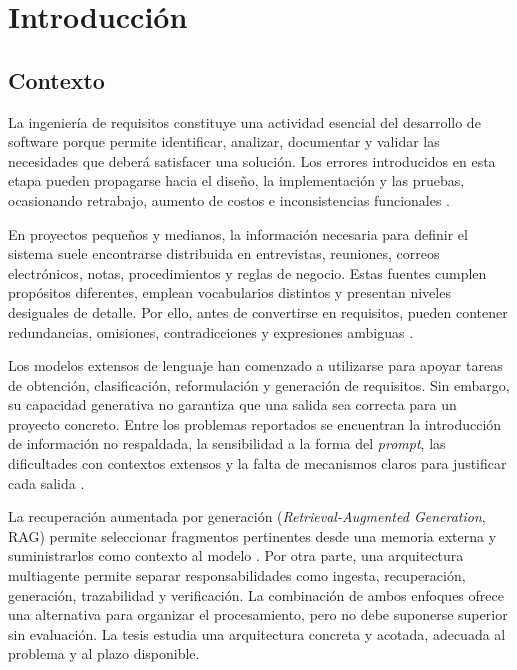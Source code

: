 \chapter{Introducción}
\label{cap:introduccion}

\section{Contexto}

La ingeniería de requisitos constituye una actividad esencial del desarrollo de software porque permite identificar, analizar, documentar y validar las necesidades que deberá satisfacer una solución. Los errores introducidos en esta etapa pueden propagarse hacia el diseño, la implementación y las pruebas, ocasionando retrabajo, aumento de costos e inconsistencias funcionales \cite{sommerville2011}.

En proyectos pequeños y medianos, la información necesaria para definir el sistema suele encontrarse distribuida en entrevistas, reuniones, correos electrónicos, notas, procedimientos y reglas de negocio. Estas fuentes cumplen propósitos diferentes, emplean vocabularios distintos y presentan niveles desiguales de detalle. Por ello, antes de convertirse en requisitos, pueden contener redundancias, omisiones, contradicciones y expresiones ambiguas \cite{wagner2019,palomares2021}.

Los modelos extensos de lenguaje han comenzado a utilizarse para apoyar tareas de obtención, clasificación, reformulación y generación de requisitos. Sin embargo, su capacidad generativa no garantiza que una salida sea correcta para un proyecto concreto. Entre los problemas reportados se encuentran la introducción de información no respaldada, la sensibilidad a la forma del \emph{prompt}, las dificultades con contextos extensos y la falta de mecanismos claros para justificar cada salida \cite{norheim2024,liu2024}.

La recuperación aumentada por generación (\emph{Retrieval-Augmented Generation}, RAG) permite seleccionar fragmentos pertinentes desde una memoria externa y suministrarlos como contexto al modelo \cite{lewis2020}. Por otra parte, una arquitectura multiagente permite separar responsabilidades como ingesta, recuperación, generación, trazabilidad y verificación. La combinación de ambos enfoques ofrece una alternativa para organizar el procesamiento, pero no debe suponerse superior sin evaluación. La tesis estudia una arquitectura concreta y acotada, adecuada al problema y al plazo disponible.

